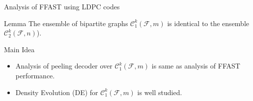 \documentclass[10pt,xcolor=table]{beamer}
\begin{document}
	\begin{frame}{Analysis of FFAST using LDPC codes}
		\begin{block}{Lemma}
			The ensemble of bipartite graphs $\mathcal{C}_{1}^{k}(\mathcal{F},m)$ is identical to the ensemble $\mathcal{C}_{2}^{k}(\mathcal{F},n)$).
		\end{block}
		
		\begin{block}{Main Idea}
			\begin{itemize}
				\item Analysis of peeling decoder over $\mathcal{C}_{1}^{k}(\mathcal{F},m)$ is same as analysis of FFAST performance.
			    \item Density Evolution (DE)  for $\mathcal{C}_{1}^{k}(\mathcal{F},m)$ is well studied.
			\end{itemize}
			
		\end{block}
	\end{frame}
\end{document}
